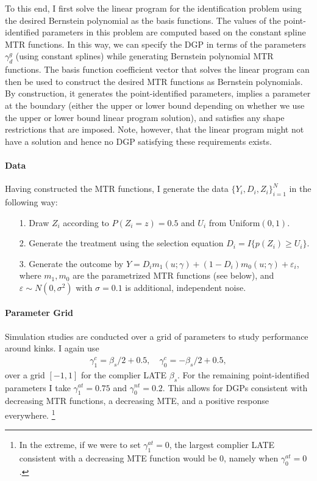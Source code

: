 \documentclass[12pt,a4paper,english]{article} %
\numberwithin{equation}{section}
\theoremstyle{definition}
\theoremstyle{remark}
\theoremstyle{plain}
\begin{document}
To this end, I first solve the linear program for the identification problem using the desired Bernstein polynomial as the basis functions.
The values of the point-identified parameters in this problem are computed based on the constant spline MTR functions.
In this way, we can specify the DGP in terms of the parameters $\gamma_d^g$ (using constant splines) while generating Bernstein polynomial MTR functions.
The basis function coefficient vector that solves the linear program can then be used to construct the desired MTR functions as Bernstein polynomials.
By construction, it generates the point-identified parameters, implies a parameter at the boundary (either the upper or lower bound depending on whether we use the upper or lower bound linear program solution), and satisfies any shape restrictions that are imposed.
Note, however, that the linear program might not have a solution and hence no DGP satisfying these requirements exists.

\paragraph{Data}
Having constructed the MTR functions, I generate the data $\{Y_i, D_i, Z_i\}_{i=1}^N$ in the following way:
\begin{itemize}
  \item[1.] Draw $Z_i$ according to $P(Z_i=z) = 0.5$ and $U_i$ from $\text{Uniform}(0,1)$.
  \item[2.] Generate the treatment using the selection equation $D_i = I\{p(Z_i) \geq U_i\}$.
  \item[3.] Generate the outcome by $Y = D_i m_1(u; \gamma) + (1 - D_i) m_0(u; \gamma) + \varepsilon_i$,
  where $m_1, m_0$ are the parametrized MTR functions (see below), and $\varepsilon\sim N(0, \sigma^2)$ with $\sigma=0.1$ is additional, independent noise.
\end{itemize}

\paragraph{Parameter Grid}
Simulation studies are conducted over a grid of parameters to study performance around kinks.
I again use
\begin{align}
  \gamma_1^c = \beta_s / 2 + 0.5, \quad \gamma_0^c = -\beta_s / 2 + 0.5,
\end{align}
over a grid $[-1, 1]$ for the complier LATE $\beta_s$.
For the remaining point-identified parameters I take $\gamma_1^{at} = 0.75$ and $\gamma_0^{nt} = 0.2$.
This allows for DGPs consistent with decreasing MTR functions, a decreasing MTE, and a positive response everywhere.
\footnote{In the extreme, if we were to set $\gamma_1^{at} = 0$, the largest complier LATE consistent with a decreasing MTE function would be $0$, namely when $\gamma_0^{at}=0$.}
\end{document}
